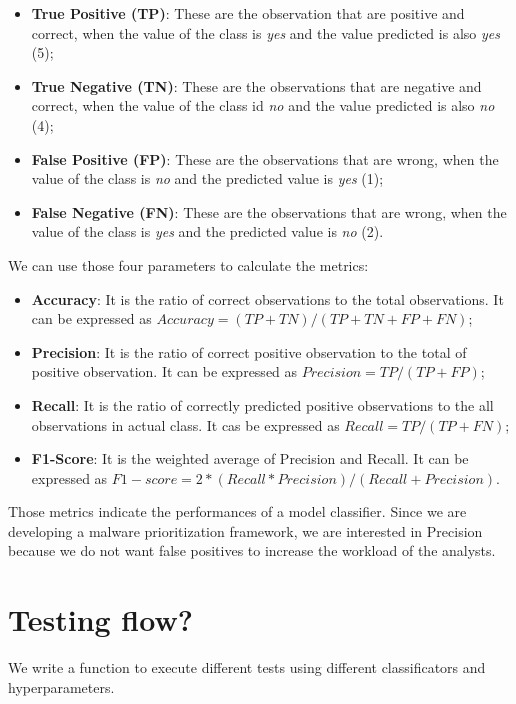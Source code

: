 \begin{itemize}
	\item \textbf{True Positive (TP)}: These are the observation that are positive and correct, when the value of the class is \textit{yes} and the value predicted is also \textit{yes} (5);
	\item \textbf{True Negative (TN)}: These are the observations that are negative and correct, when the value of the class id \textit{no} and the value predicted is also \textit{no} (4);
	\item \textbf{False Positive (FP)}: These are the observations that are wrong, when the value of the class is  \textit{no} and the predicted value is \textit{yes} (1); 
	\item \textbf{False Negative (FN)}: These are the observations that are wrong, when the value of the class is  \textit{yes} and the predicted value is \textit{no} (2).
	
	
\end{itemize} 

We can use those four parameters to calculate the metrics:
\begin{itemize}
	\item \textbf{Accuracy}: It is the ratio of correct observations to the total observations. It can be expressed as $Accuracy = (TP + TN) / (TP + TN + FP + FN)$;
	\item \textbf{Precision}: It is the ratio of correct positive observation to the total of positive observation. It can be expressed as $Precision = TP/(TP + FP)$;
	\item \textbf{Recall}: It is the ratio of  correctly predicted positive observations to the all observations in actual class. It cas be expressed as $Recall = TP/(TP + FN)$;
	\item \textbf{F1-Score}: It is the weighted average of Precision and Recall. It can be expressed as $F1-score = 2 * (Recall * Precision) / (Recall + Precision)$.
\end{itemize}
Those metrics indicate the performances of a model classifier. Since we are developing a malware prioritization framework, we are interested in Precision because we do not want false positives to increase the workload of the analysts. 


\section{Testing flow?}
\label{sec:flow}

We write a function to execute different tests using different classificators and hyperparameters. 

